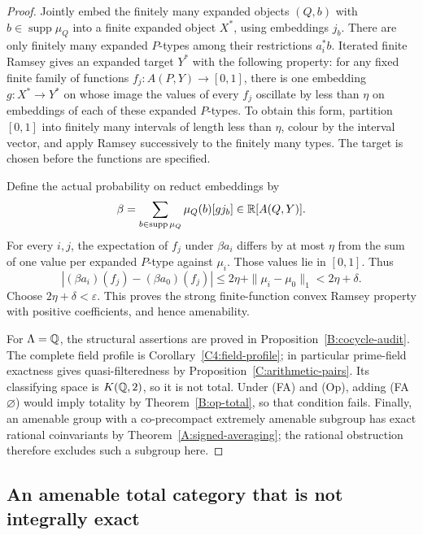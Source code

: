 \begin{proof}
Jointly embed the finitely many expanded objects
$(Q,b)$ with $b\in\operatorname{supp}\mu_Q$ into a finite
expanded object $X^*$, using embeddings $j_b$. There are only
finitely many expanded $P$-types among their restrictions
$a_i^*b$. Iterated finite Ramsey gives an expanded target
$Y^*$ with the following property: for any fixed finite family
of functions $f_j:A(P,Y)\to[0,1]$, there is one embedding
$g:X^*\to Y^*$ on whose image the values of every $f_j$
oscillate by less than $\eta$ on embeddings of each of these
expanded $P$-types. To obtain this form, partition $[0,1]$
into finitely many intervals of length less than $\eta$,
colour by the interval vector, and apply Ramsey successively
to the finitely many types. The target is chosen before the
functions are specified.

Define the actual probability on reduct embeddings by
\[
 \beta=\sum_{b\in\operatorname{supp}\mu_Q}
             \mu_Q(b)[g j_b]\in\mathbb R[A(Q,Y)].
\]
For every $i,j$, the expectation of $f_j$ under $\beta a_i$
differs by at most $\eta$ from the sum of one value per
expanded $P$-type against $\mu_i$. Those values lie in
$[0,1]$. Thus
\[
 |(\beta a_i)(f_j)-(\beta a_0)(f_j)|
       \leq2\eta+\|\mu_i-\mu_0\|_1
       <2\eta+\delta.
\]
Choose $2\eta+\delta<\varepsilon$. This proves the strong
finite-function convex Ramsey property with positive
coefficients, and hence amenability.

For $\Lambda=\mathbb Q$, the structural assertions are proved in
Proposition~\ref{B:cocycle-audit}. The complete field profile
is Corollary~\ref{C4:field-profile}; in particular prime-field
exactness gives quasi-filteredness by
Proposition~\ref{C:arithmetic-pairs}. Its classifying space is
$K(\mathbb Q,2)$, so it is not total. Under (FA) and (Op), adding
(FA$\varnothing$) would imply totality by
Theorem~\ref{B:op-total}, so that condition fails. Finally,
an amenable group with a co-precompact extremely amenable
subgroup has exact rational coinvariants by
Theorem~\ref{A:signed-averaging}; the rational obstruction
therefore excludes such a subgroup here.
\end{proof}

\subsection{An amenable total category that is not integrally exact}



